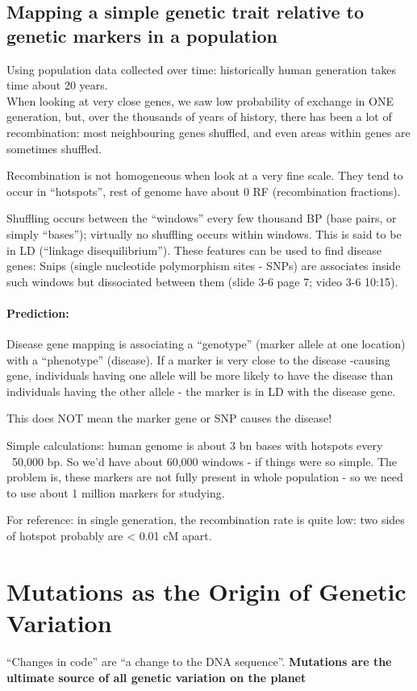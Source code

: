 \documentclass{scrartcl}
\begin{document}
\subsection{Mapping a simple genetic trait relative to genetic markers in a
  population}
\label{sec:3-6}
Using population data collected over time: historically human generation takes
time about 20 years. \\
When looking at very close genes, we saw low probability of exchange in ONE
generation, but, over the thousands of years of history, there has been a lot of
recombination: most neighbouring genes shuffled, and even areas within genes are
sometimes shuffled.

Recombination is not homogeneous when look at a very fine scale. They tend to
occur in ``hotspots'', rest of genome have about 0 RF (recombination fractions).

Shuffling occurs between the ``windows'' every few thousand BP (base pairs, or
simply ``bases''); virtually no shuffling occurs within windows. This is said to
be in LD (``linkage disequilibrium''). These features can be used to find
disease genes: Snips (single nucleotide polymorphism sites - SNPs) are
associates inside such windows but dissociated between them (slide 3-6 page 7;
video 3-6 10:15).

\paragraph{Prediction:}

Disease gene mapping is associating a ``genotype'' (marker allele at one
location) with a ``phenotype'' (disease). If a marker is very close to the
disease -causing gene, individuals having one allele will be more likely to have
the disease than individuals having the other allele - the marker is in LD with
the disease gene.

This does NOT mean the marker gene or SNP causes the disease!

Simple calculations: human genome is about 3 bn bases with hotspots every
~50,000 bp. So we'd have about 60,000 windows - if things were so simple. The
problem is, these markers are not fully present in whole population - so we need
to use about 1 million markers for studying.

For reference: in single generation, the recombination rate is quite low: two
sides of hotspot probably are < 0.01 cM apart.

\section{Mutations as the Origin of Genetic Variation}
\label{sec:04-1}
``Changes in code'' are  ``a change to the DNA sequence''.  {\bf Mutations are the ultimate source of all genetic variation on the planet}
\end{document}
